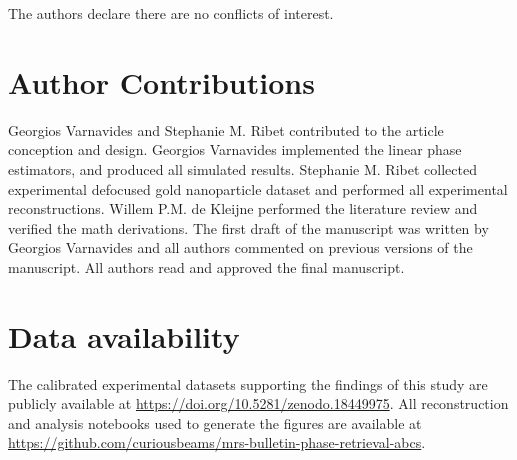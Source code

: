 \documentclass[pdflatex,sn-aps,iicol]{sn-jnl}%
\begin{document}
The authors declare there are no conflicts of interest.

\section*{Author Contributions}

Georgios Varnavides and Stephanie M. Ribet contributed to the article conception and design.
Georgios Varnavides implemented the linear phase estimators, and produced all simulated results.
Stephanie M. Ribet collected experimental defocused gold nanoparticle dataset and performed all experimental reconstructions.
Willem P.M. de Kleijne performed the literature review and verified the math derivations.
The first draft of the manuscript was written by Georgios Varnavides and all authors commented on previous versions of the manuscript.
All authors read and approved the final manuscript.

\section*{Data availability}

The calibrated experimental datasets supporting the findings of this study are publicly available at \url{https://doi.org/10.5281/zenodo.18449975}.
All reconstruction and analysis notebooks used to generate the figures are available at \url{https://github.com/curiousbeams/mrs-bulletin-phase-retrieval-abcs}.


\end{document}
